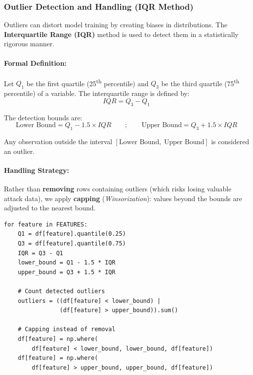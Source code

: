 \documentclass[12pt,a4paper]{article}
\begin{document}
\subsubsection{Outlier Detection and Handling (IQR Method)}

Outliers can distort model training by creating biases in distributions. The \textbf{Interquartile Range (IQR)} method is used to detect them in a statistically rigorous manner.

\paragraph{Formal Definition:} Let $Q_1$ be the first quartile (25\textsuperscript{th} percentile) and $Q_3$ be the third quartile (75\textsuperscript{th} percentile) of a variable. The interquartile range is defined by:
\begin{equation}
    IQR = Q_3 - Q_1
\end{equation}

\noindent The detection bounds are:
\begin{equation}
    \text{Lower Bound} = Q_1 - 1.5 \times IQR \qquad ; \qquad \text{Upper Bound} = Q_3 + 1.5 \times IQR
\end{equation}

\noindent Any observation outside the interval $[\text{Lower Bound},\; \text{Upper Bound}]$ is considered an outlier.

\paragraph{Handling Strategy:} Rather than \textbf{removing} rows containing outliers (which risks losing valuable attack data), we apply \textbf{capping} (\textit{Winsorization}): values beyond the bounds are adjusted to the nearest bound.

\begin{lstlisting}[caption={Outlier detection and capping using IQR}]
for feature in FEATURES:
    Q1 = df[feature].quantile(0.25)
    Q3 = df[feature].quantile(0.75)
    IQR = Q3 - Q1
    lower_bound = Q1 - 1.5 * IQR
    upper_bound = Q3 + 1.5 * IQR

    # Count detected outliers
    outliers = ((df[feature] < lower_bound) |
                (df[feature] > upper_bound)).sum()

    # Capping instead of removal
    df[feature] = np.where(
        df[feature] < lower_bound, lower_bound, df[feature])
    df[feature] = np.where(
        df[feature] > upper_bound, upper_bound, df[feature])
\end{lstlisting}
\end{document}
